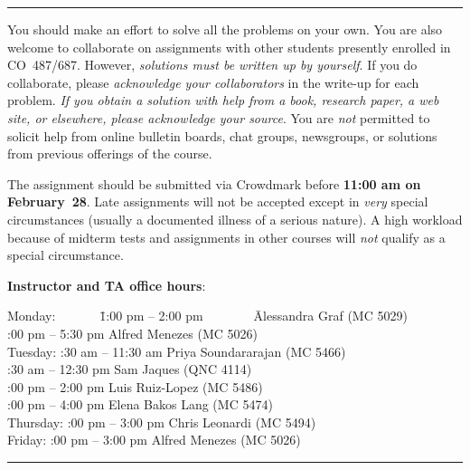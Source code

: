 \documentclass[11pt]{article}
\begin{document}
\hfill\hrule

\vspace*{2mm}
\noindent
You should make an effort to solve all the problems on your own.
You are also welcome to collaborate on assignments with other students
presently enrolled in CO~487/687. However, \emph{solutions must be
written up by yourself}. If you do collaborate, please \emph{acknowledge
your collaborators} in the write-up for each problem. \emph{If you
obtain a solution with help from a book, research paper, a web site,
or elsewhere, please acknowledge your source}. You are \emph{not}
permitted to solicit help from online bulletin boards, chat groups,
newsgroups, or solutions from previous offerings of the course.

\vspace*{2mm}
\noindent
The assignment should be submitted via Crowdmark before {\bf 11:00 am
on February~28}. Late assignments will not be accepted except in
\emph{very} special circumstances (usually a documented illness of
a serious nature). A high workload because of midterm tests and assignments
in other courses will \emph{not} qualify as a special circumstance.

\vspace*{4mm}
\noindent
{\bf Instructor and TA office hours}:
\begin{tabbing}
Monday:~~~~~~~\=1:00 pm -- 2:00 pm~~~~~~~~\= Alessandra Graf (MC 5029)\\
:00 pm -- 5:30 pm \> Alfred Menezes (MC 5026)\\
Tuesday: :30 am -- 11:30 am \> Priya Soundararajan (MC 5466)\\
:30 am -- 12:30 pm \> Sam Jaques (QNC 4114)\\
:00 pm -- 2:00 pm \> Luis Ruiz-Lopez (MC 5486)\\
:00 pm -- 4:00 pm \> Elena Bakos Lang (MC 5474)\\
Thursday: :00 pm -- 3:00 pm \> Chris Leonardi (MC 5494)\\
Friday: :00 pm -- 3:00 pm \> Alfred Menezes (MC 5026)
\end{tabbing}

\hfill\hrule
\end{document}
